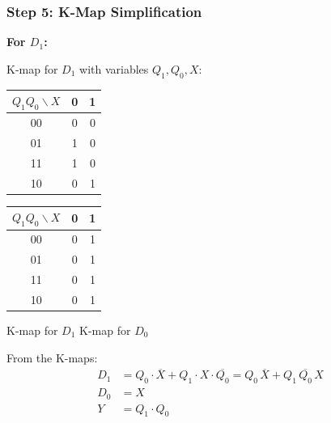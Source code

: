 \documentclass[12pt,a4paper]{article}
\begin{document}
\subsubsection{Step 5: K-Map Simplification}

\textbf{For $D_1$:}

\begin{figure}[H]
\centering
{}
\end{figure}

K-map for $D_1$ with variables $Q_1, Q_0, X$:

\begin{table}[H]
\centering
\begin{tabular}{c|cc}
\toprule
$Q_1 Q_0 \backslash X$ & 0 & 1 \\
\midrule
00 & 0 & 0 \\
01 & 1 & 0 \\
11 & 1 & 0 \\
10 & 0 & 1 \\
\bottomrule
\end{tabular}
\quad\quad
\begin{tabular}{c|cc}
\toprule
$Q_1 Q_0 \backslash X$ & 0 & 1 \\
\midrule
00 & 0 & 1 \\
01 & 0 & 1 \\
11 & 0 & 1 \\
10 & 0 & 1 \\
\bottomrule
\end{tabular}

\vspace{0.3cm}
\hspace{1cm} K-map for $D_1$ \hspace{3cm} K-map for $D_0$
\end{table}

From the K-maps:
\begin{align}
D_1 &= Q_0 \cdot \overline{X} + Q_1 \cdot X \cdot \overline{Q_0} = Q_0\,\overline{X} + Q_1\,\overline{Q_0}\,X \\
D_0 &= X \\
Y &= Q_1 \cdot Q_0
\end{align}
\end{document}
